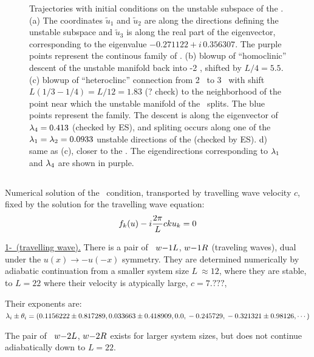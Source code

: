 \begin{figure}[h]
\caption{
 Trajectories with initial conditions on the unstable subspace of
 the  {\eqva}.  
 (a) The coordinates $\tilde{u}_1$ and $\tilde{u}_2$ are along the directions defining the unstable subspace
 and $\tilde{u}_3$  is along the real part of the eigenvector, 
 corresponding to the eigenvalue $-0.271122+ i\, 0.356307$. The purple points represent the continous family
 of 
 \eqva.
(b) blowup of ``homoclinic'' descent of the unstable manifold
back into {\nameit}-2 {\eqv}, shifted by
$L/4 =5.5$.
(c) blowup of ``heteroclinc'' connection from 
{\nameit}2 \eqv\ to {\nameit}3 \eqv\, with shift 
$L(1/3-1/4) = L/12 = 1.83$ (? check)
to the neighborhood of the point near which the
unstable manifold of the 
 \eqv\ splits. The blue points
represent the 
 {\eqv} family.
The descent is along the eigenvector of $\lambda_4= 0.413$ (checked by ES),
and spliting
occurs along one of the 
$\lambda_1=\lambda_2=0.0933$
unstable directions of the  {\eqv} (checked by ES).
d) same as (c), closer to the  {\eqv}. The eigendirections corresponding to $\lambda_1$
and $\lambda_4$ are shown in purple. 
}
\label{f:neighborhood2w}
\end{figure}


\subsection{\Reqva}

Numerical solution of the \reqv\  condition,
transported by travelling wave velocity $c$, 
fixed by the solution for the travelling wave equation:
\[
f_k(u) - i{2\pi\over L} c k u_k = 0
\]

\underline{1-\reqv\  (travelling wave).}
There is a pair of \reqva\ 
${w-}1L$,
${w-}1R$
(traveling waves), dual under the
$u(x) \to -u(-x)$ symmetry. They are 
determined numerically by 
adiabatic continuation from a smaller system size
$L~\approx 12$,
where they are stable, to $L=22$
where their velocity is atypically large, $c=7.???$,

Their exponents are:
\\
$\lambda_i \pm \theta_i =
(
\\
  0.1156222 \pm 0.817289,	\\
  0.033663 \pm 0.418909,	\\
 0.0                    ,	\\
 -0.245729                    ,	\\
 -0.321321 \pm 0.98126,
\cdots
)$

The pair of \reqva\ 
${w-}2L$,
${w-}2R$
exists for larger system sizes, but does not continue 
adiabatically down to $L=22$.


